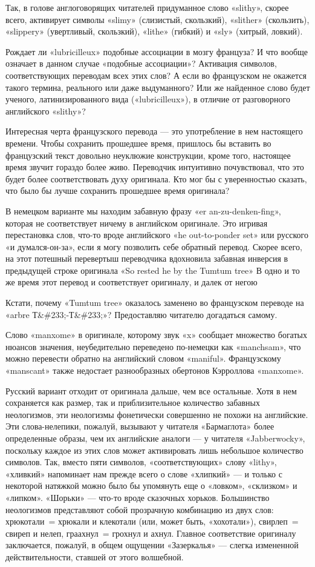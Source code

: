 \documentclass[../main.tex]{subfiles}
\begin{document}
Так, в голове англоговорящих читателей придуманное слово «slithy», скорее всего, активирует символы «slimy» (слизистый, скользкий), «slither» (скользить), «slippery» (увертливый, скользкий), «lithe» (гибкий) и «sly» (хитрый, ловкий).

Рождает ли «lubricilleux» подобные ассоциации в мозгу француза? И что вообще означает в данном случае «подобные ассоциации»? Активация символов, соответствующих переводам всех этих слов? А если во французском не окажется такого термина, реального или даже выдуманного? Или же найденное слово будет ученого, латинизированного вида («lubricilleux»), в отличие от разговорного английского «slithy»?

Интересная черта французского перевода --- это употребление в нем настоящего времени. Чтобы сохранить прошедшее время, пришлось бы вставить во французский текст довольно неуклюжие конструкции, кроме того, настоящее время звучит гораздо более живо. Переводчик интуитивно почувствовал, что это будет более соответствовать духу оригинала. Кто мог бы с уверенностью сказать, что было бы лучше сохранить прошедшее время оригинала?

В немецком варианте мы находим забавную фразу «er an-zu-denken-fing», которая не соответствует ничему в английском оригинале. Это игривая перестановка слов, что-то вроде английского «he out-to-ponder set» или русского «и думался-он-за», если я могу позволить себе обратный перевод. Скорее всего, на этот потешный перевертыш переводчика вдохновила забавная инверсия в предыдущей строке оригинала «So rested he by the Tumtum tree» В одно и то же время этот перевод и соответствует оригиналу, и далек от негою

Кстати, почему «Tumtum tree» оказалось заменено во французском переводе на «arbre Т\&\#233;-Т\&\#233;»? Предоставляю читателю догадаться самому.

Слово «manxome» в оригинале, которому звук «x» сообщает множество богатых нюансов значения, неубедительно переведено по-немецки как «manchsam», что можно перевести обратно на английский словом «maniful». Французскому «manscant» также недостает разнообразных обертонов Кэрроллова «manxome».

Русский вариант отходит от оригинала дальше, чем все остальные. Хотя в нем сохраняется как размер, так и приблизительное количество забавных неологизмов, эти неологизмы фонетически совершенно не похожи на английские. Эти слова-нелепики, пожалуй, вызывают у читателя «Бармаглота» более определенные образы, чем их английские аналоги --- у читателя «Jabberwocky», поскольку каждое из этих слов может активировать лишь небольшое количество символов. Так, вместо пяти символов, «соответствующих» слову «lithy», «хливкий» напоминает нам прежде всего о слове «хлипкий» --- и только с некоторой натяжкой можно было бы упомянуть еще о «ловком», «склизком» и «липком». «Шорьки» --- что-то вроде сказочных хорьков. Большинство неологизмов представляют собой прозрачную комбинацию из двух слов: хрюкотали~= хрюкали и клекотали (или, может быть, «хохотали»), свирлеп~= свиреп и нелеп, граахнул~= грохнул и ахнул. Главное соответствие оригиналу заключается, пожалуй, в общем ощущении «Зазеркалья» --- слегка измененной действительности, ставшей от этого волшебной.
\end{document}
